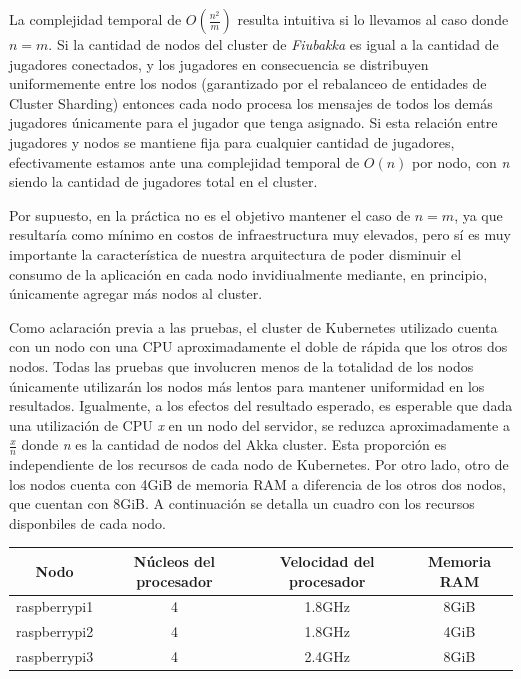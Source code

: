 La complejidad temporal de $O(\frac{n^2}{m})$ resulta intuitiva si lo llevamos al caso donde $n = m$. Si la cantidad de nodos del cluster de \textit{Fiubakka} es igual a la cantidad de jugadores conectados,
y los jugadores en consecuencia se distribuyen uniformemente entre los nodos (garantizado por el rebalanceo de entidades de Cluster Sharding) entonces cada nodo procesa los mensajes de todos los demás jugadores
únicamente para el jugador que tenga asignado. Si esta relación entre jugadores y nodos se mantiene fija para cualquier cantidad de jugadores, efectivamente estamos ante una complejidad temporal de $O(n)$ por nodo, con
\textit{n} siendo la cantidad de jugadores total en el cluster.

Por supuesto, en la práctica no es el objetivo mantener el caso de $n = m$, ya que resultaría como mínimo en costos de infraestructura muy elevados, pero sí es muy importante la característica de nuestra arquitectura de poder
disminuir el consumo de la aplicación en cada nodo invidiualmente mediante, en principio, únicamente agregar más nodos al cluster.

Como aclaración previa a las pruebas, el cluster de Kubernetes utilizado cuenta con un nodo con una CPU aproximadamente el doble de rápida que los otros dos nodos.
Todas las pruebas que involucren menos de la totalidad de los nodos únicamente utilizarán los nodos más lentos para mantener uniformidad en los resultados.
Igualmente, a los efectos del resultado esperado, es esperable que dada una utilización de CPU \textit{x} en un nodo del servidor, se reduzca aproximadamente a
$\frac{x}{n}$ donde \textit{n} es la cantidad de nodos del Akka cluster. Esta proporción es independiente de los recursos de cada nodo de Kubernetes. Por otro lado,
otro de los nodos cuenta con 4GiB de memoria RAM a diferencia de los otros dos nodos, que cuentan con 8GiB. A continuación se detalla un cuadro con los recursos disponbiles
de cada nodo.

\begin{center}
\begin{tabular}{|c|c|c|c|}
    \hline
    \textbf{Nodo} & \textbf{Núcleos del procesador} & \textbf{Velocidad del procesador} & \textbf{Memoria RAM} \\
    \hline
    raspberrypi1 & 4 & 1.8GHz & 8GiB \\
    \hline
    raspberrypi2 & 4 & 1.8GHz & 4GiB \\
    \hline
    raspberrypi3 & 4 & 2.4GHz & 8GiB \\
    \hline
\end{tabular}
\end{center}

